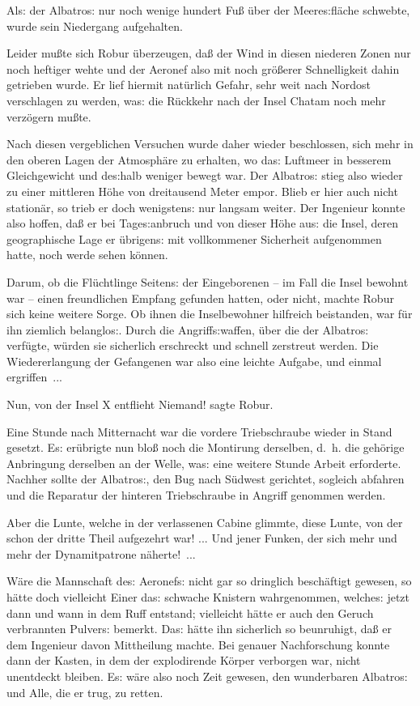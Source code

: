 \documentclass[oneside,12pt]{book}
\newcommand{\s}{s:}
\begin{document}
Al{\s} der {\glqq}Albatro{\s}{\grqq} nur noch wenige hundert Fu{\ss}
\"uber der Meere{\s}fl\"ache schwebte, wurde sein Niedergang
aufgehalten.

Leider mu{\ss}te sich Robur \"uberzeugen, da{\ss} der Wind in diesen
niederen Zonen nur noch heftiger wehte und der Aeronef also mit noch
gr\"o{\ss}erer Schnelligkeit dahin getrieben wurde. Er lief hiermit
nat\"urlich Gefahr, sehr weit nach Nordost verschlagen zu werden,
wa{\s} die R\"uckkehr nach der Insel Chatam noch mehr verz\"ogern
mu{\ss}te.

Nach diesen vergeblichen Versuchen wurde daher wieder beschlossen,
sich mehr in den oberen Lagen der Atmosph\"are zu erhalten, wo da{\s}
Luftmeer in besserem Gleichgewicht und de{\s}halb weniger bewegt war.
Der {\glqq}Albatro{\s}{\grqq} stieg also wieder zu einer mittleren
H\"ohe von dreitausend Meter empor. Blieb er hier auch nicht
station\"ar, so trieb er doch wenigsten{\s} nur langsam weiter. Der
Ingenieur konnte also hoffen, da{\ss} er bei Tage{\s}anbruch und von
dieser H\"ohe au{\s} die Insel, deren geographische Lage er
\"ubrigen{\s} mit vollkommener Sicherheit aufgenommen hatte, noch
werde sehen k\"onnen.

Darum, ob die Fl\"uchtlinge Seiten{\s} der Eingeborenen -- im Fall
die Insel bewohnt war -- einen freundlichen Empfang gefunden hatten,
oder nicht, machte Robur sich keine weitere Sorge. Ob ihnen die
Inselbewohner hilfreich beistanden, war f\"ur ihn ziemlich
belanglo{\s}. Durch die Angriff{\s}waffen, \"uber die der
{\glqq}Albatro{\s}{\grqq} verf\"ugte, w\"urden sie sicherlich
erschreckt und schnell zerstreut werden. Die Wiedererlangung der
Gefangenen war also eine leichte Aufgabe, und einmal ergriffen~...

{\glqq}Nun, von der Insel X entflieht Niemand!{\grqq} sagte Robur.

Eine Stunde nach Mitternacht war die vordere Triebschraube wieder in
Stand gesetzt. E{\s} er\"ubrigte nun blo{\ss} noch die Montirung
derselben, d.~h. die geh\"orige Anbringung derselben an der Welle,
wa{\s} eine weitere Stunde Arbeit erforderte. Nachher sollte der
{\glqq}Albatro{\s}{\grqq}, den Bug nach S\"udwest gerichtet, sogleich
abfahren und die Reparatur der hinteren Triebschraube in Angriff
genommen werden.

Aber die Lunte, welche in der verlassenen Cabine glimmte, diese
Lunte, von der schon der dritte Theil aufgezehrt war! ... Und jener
Funken, der sich mehr und mehr der Dynamitpatrone n\"aherte!~...

W\"are die Mannschaft de{\s} Aeronef{\s} nicht gar so dringlich
besch\"aftigt gewesen, so h\"atte doch vielleicht Einer da{\s}
schwache Knistern wahrgenommen, welche{\s} jetzt dann und wann in dem
Ruff entstand; vielleicht h\"atte er auch den Geruch verbrannten
Pulver{\s} bemerkt. Da{\s} h\"atte ihn sicherlich so beunruhigt,
da{\ss} er dem Ingenieur davon Mittheilung machte. Bei genauer
Nachforschung konnte dann der Kasten, in dem der explodirende
K\"orper verborgen war, nicht unentdeckt bleiben. E{\s} w\"are also
noch Zeit gewesen, den wunderbaren {\glqq}Albatro{\s}{\grqq} und
Alle, die er trug, zu retten.
\end{document}
